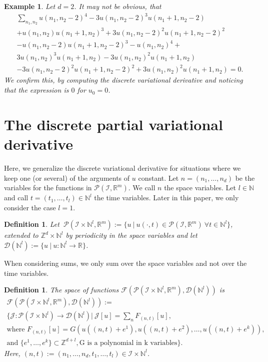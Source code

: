 \documentclass[sigconf,twocolumn]{acmart}
\newcommand{\Rr}{{\mathbb{R}}}
\newcommand{\Nn}{{\mathbb{N}}}
\newcommand{\Zz}{{\mathbb{Z}}}
\newcommand{\1}{{\chi}}
\newcommand{\Ii}{{\mathcal{I}}}
\numberwithin{equation}{section}
\theoremstyle{thmlemcorr}
\numberwithin{theorem}{section}
\theoremstyle{thmlemcorr*}
\theoremstyle{defi}
\newtheorem{definition}[theorem]{Definition}
\theoremstyle{remexample}
\newtheorem{example}[theorem]{Example}
\theoremstyle{ass}
\begin{document}
\begin{example}
	Let $d=2$. It may not be obvious, that
	\begin{gather*}
		\sum_{n_1,n_2}u(n_1,n_2-2)^4 - 3 u(n_1,n_2-2)^3 u(n_1+1,n_2-2) \\+ 
		u(n_1,n_2) u(n_1+1,n_2)^3 + 3 u(n_1,n_2-2)^2 u(n_1+1,n_2-2)^2\\ -
		u(n_1,n_2-2) u(n_1+1,n_2-2)^3
		- u(n_1, n_2)^4 +\\
		3 u(n_1,n_2)^3 u(n_1+1,n_2)- 3 u(n_1,n_2)^2 u(n_1+1,n_2)\\
		-3 u(n_1,n_2-2)^2 u(n_1+1,n_2-2)^2+ 3 u(n_1,n_2)^2 u(n_1+1,n_2)=0.
	\end{gather*}
	We confirm this, by computing the discrete variational derivative and noticing that the expression is $0$ for $u_0=0$.
\end{example}
\section{The discrete partial variational derivative}
\label{pvard}
Here, we generalize the discrete variational derivative for situations where we keep one (or several) of the arguments of $u$ constant.
Let $n=(n_1,\ldots,n_d)$ be the variables for the functions in $\mathcal{P}(\Ii,\Rr^m)$. We call $n$ the space variables. Let $l\in\Nn$ and call $t=(t_1,\ldots,t_l)\in\Nn^l$ the time variables. Later in this paper, we only consider the case $l=1$.
\begin{definition}
	Let $\ \mathcal{P}(\Ii\times\Nn^l,\Rr^m):=\{u\ |\ u(\cdot,t)\in\mathcal{P}(\Ii,\Rr^m)\ \forall t\in\Nn^l \}$, extended to $\Zz^d\times\Nn^l$ by periodicity in the space variables and let $\mathcal{D}(\Nn^l):=\{u\ |\ u:\Nn^l\rightarrow\Rr\}$.
\end{definition}
When considering sums, we only sum over the space variables and not over the time variables.
\begin{definition}
	\label{quantityfunc2}
	The space of functions $\mathcal{F}(\mathcal{P}(\Ii\times\Nn^l,\Rr^m),\mathcal{D}(\Nn^l))$ is
	\begin{gather*}
		\mathcal{F}(\mathcal{P}(\Ii\times\Nn^l,\Rr^m),\mathcal{D}(\Nn^l)):=\\	
		\Bigg\{\mathcal{J}:\mathcal{P}(\Ii\times\Nn^l)\rightarrow\mathcal{D}(\Nn^l) \Bigg|\ \mathcal{J}[u]=\sum_{n}F_{(n,t)}[u],\\
		\text{where } F_{(n,t)}[u]=G(u((n,t)+e^1),u((n,t)+e^2),\ldots,u((n,t)+e^k)),\\
		\text{and }
		\{e^1,\ldots,e^k\}\subset\Zz^{d+l},\text{G is a polynomial in k variables}\Bigg\}.
	\end{gather*}
Here, $(n,t):=(n_1,\ldots,n_d,t_1,\ldots,t_l)\in\Ii\times\Nn^l$.
\end{definition}
\end{document}
